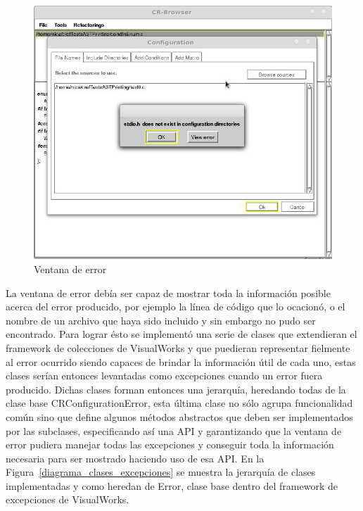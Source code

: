 \documentclass[a4paper,oneside,12pt]{article}
\begin{document}
\begin{figure}[h!]
  \centering
    \includegraphics[scale=0.50]{images/codigo_modificado/error_header_no_encontrado.jpg}
     \caption{Ventana de error}
     \label{ventana_de_error}
\end{figure}

La ventana de error deb\'ia ser capaz de mostrar toda la informaci\'on posible acerca del error producido, por ejemplo la l\'inea de c\'odigo que lo ocacion\'o, o el nombre de un archivo que haya sido incluido y sin embargo no pudo ser encontrado. Para lograr \'esto se implement\'o una serie de clases que extendieran el framework de colecciones de VisualWorks y que puedieran representar fielmente al error ocurrido siendo capaces de brindar la informaci\'on \'util de cada uno, estas clases ser\'ian entonces levantadas como excepciones cuando un error fuera producido. Dichas clases forman entonces una jerarqu\'ia, heredando todas de la clase base CRConfigurationError, esta \'ultima clase no s\'olo agrupa funcionalidad com\'un sino que define algunos m\'etodos abstractos que deben ser implementados por las subclases, especificando as\'i una API y garantizando que la ventana de error pudiera manejar todas las excepciones y conseguir toda la informaci\'on necesaria para ser mostrado haciendo uso de esa API.
En la Figura~\ref{diagrama_clases_excepciones} se muestra la jerarqu\'ia de clases implementadas y como heredan de Error, clase base dentro del framework de excepciones de VisualWorks.
\end{document}
